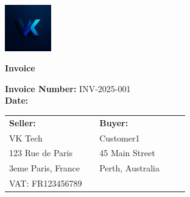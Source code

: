 \documentclass[a4paper,12pt]{article}
\begin{document}
\noindent
\begin{minipage}{0.15\linewidth}
    \includegraphics[height=20mm]{../../smartinvoice/resources/latex_resources/vk_logo.png}
\end{minipage}%
\hfill
\begin{minipage}{0.85\linewidth}
    \begin{center}
        {\Huge \textbf{Invoice}}
    \end{center}
\end{minipage}



\vspace{0.8cm}


\noindent
\textbf{Invoice Number:} INV-2025-001 \\
\textbf{Date:}  \\[0.5cm]

\vspace{0.4cm}

\noindent
\begin{tabular}{p{0.45\linewidth} p{0.45\linewidth}}
\textbf{Seller:} & \textbf{Buyer:} \\
VK Tech & Customer1 \\
123 Rue de Paris & 45 Main Street \\
3eme Paris, France & Perth, Australia \\
VAT: FR123456789 &  \\
\end{tabular}

\vspace{0.8cm}
\end{document}
